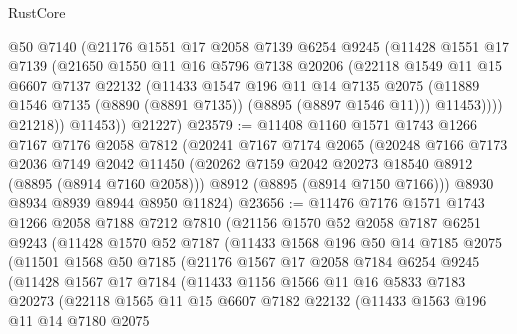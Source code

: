 \begin{lexlean}{RustCore}
\begin{coremodule}
            @50
            @7140
            (@21176
              @1551
              @17
              @2058
              @7139
              @6254
              @9245
              (@11428
                @1551
                @17
                @7139
                (@21650
                  @1550
                  @11
                  @16
                  @5796
                  @7138
                  @20206
                  (@22118
                    @1549
                    @11
                    @15
                    @6607
                    @7137
                    @22132
                    (@11433
                      @1547
                      @196
                      @11
                      @14
                      @7135
                      @2075
                      (@11889 @1546 @7135 (@8890 (@8891 @7135)) (@8895 (@8897 @1546 @11)))
                      @11453))))
              @21218))
          @11453))
      @21227)
@23579 := @11408
    @1160
    @1571
    @1743
    @1266
    @7167
    @7176
    @2058
    @7812
    (@20241
      @7167
      @7174
      @2065
      (@20248
        @7166
        @7173
        @2036
        @7149
        @2042
        @11450
        (@20262 @7159 @2042 @20273 @18540 @8912 (@8895 (@8914 @7160 @2058)))
        @8912
        (@8895 (@8914 @7150 @7166)))
      @8930
      @8934
      @8939
      @8944
      @8950
      @11824)
@23656 := @11476
    @7176
    @1571
    @1743
    @1266
    @2058
    @7188
    @7212
    @7810
    (@21156
      @1570
      @52
      @2058
      @7187
      @6251
      @9243
      (@11428
        @1570
        @52
        @7187
        (@11433
          @1568
          @196
          @50
          @14
          @7185
          @2075
          (@11501
            @1568
            @50
            @7185
            (@21176
              @1567
              @17
              @2058
              @7184
              @6254
              @9245
              (@11428
                @1567
                @17
                @7184
                (@11433
                  @1156
                  @1566
                  @11
                  @16
                  @5833
                  @7183
                  @20273
                  (@22118
                    @1565
                    @11
                    @15
                    @6607
                    @7182
                    @22132
                    (@11433
                      @1563
                      @196
                      @11
                      @14
                      @7180
                      @2075

\end{coremodule}
\end{lexlean}
